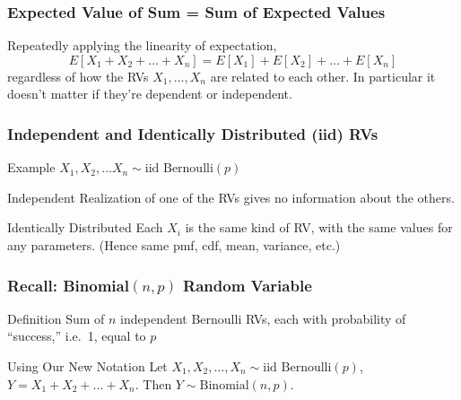 \begin{frame}
\frametitle{Expected Value of Sum = Sum of Expected Values}
Repeatedly applying the linearity of expectation,
$$E[X_1 + X_2 + \hdots + X_n] = E[X_1] + E[X_2] + \hdots + E[X_n]$$
regardless of how the RVs $X_1, \hdots, X_n$ are related to each other. In particular it \alert{doesn't matter if they're dependent or independent}.


\end{frame}
\begin{frame}
\frametitle{Independent and Identically Distributed (iid) RVs}

\begin{block}{Example}
	$X_1, X_2, \hdots X_n \sim \mbox{iid Bernoulli}(p)$
\end{block}

\begin{block}{Independent}
Realization of one of the RVs gives no information about the others.
\end{block}

\begin{block}{Identically Distributed}
Each $X_i$ is the same kind of RV, with the same values for any parameters. (Hence same pmf, cdf, mean, variance, etc.)
\end{block}

\end{frame}
\begin{frame}
\frametitle{Recall: Binomial$(n,p)$ Random Variable}

\begin{block}{Definition}
Sum of $n$ independent Bernoulli RVs, each with probability of ``success,'' i.e.\ 1, equal to $p$
\end{block}


\begin{alertblock}{Using Our New Notation}
Let $X_1, X_2, \hdots, X_n \sim \mbox{iid Bernoulli}(p)$, $Y = X_1 + X_2 + \hdots + X_n$. Then $Y \sim \mbox{Binomial}(n,p)$.
\end{alertblock}


\end{frame}
%
